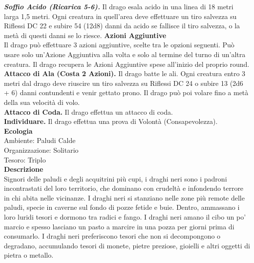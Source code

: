 \begin{multicols}{2}
\emph{\textbf{Soffio Acido (Ricarica 5-6).}} Il drago esala acido in una linea di 18 metri larga 1,5 metri. Ogni creatura in quell'area deve effettuare un tiro salvezza su Riflessi DC  22 e subire 54 (12d8) danni da acido se fallisce il tiro salvezza, o la metà di questi danni se lo riesce. 
\textbf{Azioni Aggiuntive}\\
Il drago può effettuare 3 azioni aggiuntive, scelte tra le opzioni seguenti. Può usare solo un'Azione Aggiuntiva alla volta e solo al termine del turno di un'altra creatura. Il drago recupera le Azioni Aggiuntive spese all'inizio del proprio round.\\
\textbf{Attacco di Ala (Costa 2 Azioni).} Il drago batte le ali. Ogni creatura entro 3 metri dal drago deve riuscire un tiro salvezza su Riflessi DC  24 o subire 13 (2d6 + 6) danni contundenti e venir gettato prono. Il drago può poi volare fino a metà della sua velocità di volo.\\
\textbf{Attacco di Coda.} Il drago effettua un attacco di coda.\\
\textbf{Individuare.} Il drago effettua una prova di Volontà (Consapevolezza).\\
\textbf{Ecologia}\\
Ambiente: Paludi Calde\\
Organizzazione: Solitario\\
Tesoro: Triplo\\
\textbf{Descrizione}\\
Signori delle paludi e degli acquitrini più cupi, i draghi neri sono i padroni incontrastati del loro territorio, che dominano con crudeltà e infondendo terrore in chi abita nelle vicinanze. I draghi neri si stanziano nelle zone più remote delle paludi, specie in caverne sul fondo di pozze fetide e buie. Dentro, ammassano i loro luridi tesori e dormono tra radici e fango. I draghi neri amano il cibo un po’ marcio e spesso lasciano un pasto a marcire in una pozza per giorni prima di consumarlo. I draghi neri preferiscono tesori che non si decompongono o degradano, accumulando tesori di monete, pietre preziose, gioielli e altri oggetti di pietra o metallo.\\


\end{multicols}
